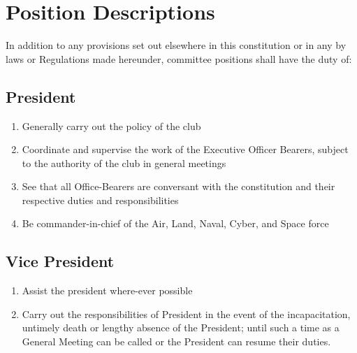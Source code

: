 \documentclass[10pt,a4paper]{report}
\begin{document}
	\section{Position Descriptions}
	In addition to any provisions set out elsewhere in this constitution or in any by laws or Regulations made hereunder, committee positions shall have the duty of:
		\subsection{President}
			\begin{enumerate}[label=\alph*]
				\item Generally carry out the policy of the club
				\item Coordinate and supervise the work of the Executive Officer Bearers, subject to the authority of the club in general meetings
				\item See that all Office-Bearers are conversant with the constitution and their respective duties and responsibilities
				\item Be commander-in-chief of the Air, Land, Naval, Cyber, and Space force
			\end{enumerate}
		\subsection{Vice President}
			\begin{enumerate}[label=\alph*]
				\item Assist the president where-ever possible
				\item Carry out the responsibilities of President in the event of the incapacitation, untimely death or lengthy absence of the President; until such a time as a General Meeting can be called or the President can resume their duties.
			\end{enumerate}
\end{document}
